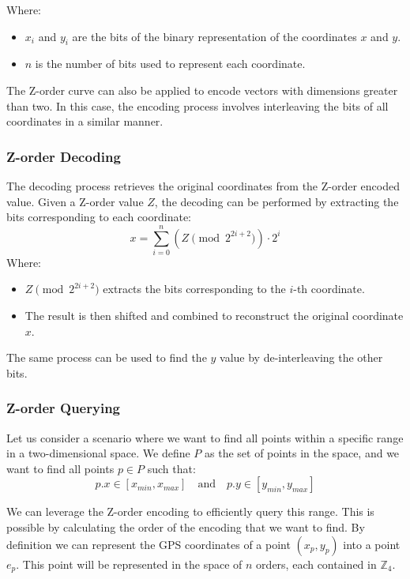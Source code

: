 Where:
\begin{itemize}
    \item \( x_i \) and \( y_i \) are the bits of the binary representation of the coordinates \( x \) and \( y \).
    \item \( n \) is the number of bits used to represent each coordinate.
\end{itemize}

The Z-order curve can also be applied to encode vectors with dimensions greater than two. In this case, the encoding process involves interleaving the bits of all coordinates in a similar manner.


\subsubsection{Z-order Decoding}
The decoding process retrieves the original coordinates from the Z-order encoded value. Given a Z-order value \( Z \), the decoding can be performed by extracting the bits corresponding to each coordinate:
\[
    x = \sum_{i=0}^{n} (Z \pmod{ 2^{2i+2} }) \cdot 2^i
\]
Where:
\begin{itemize}
    \item \( Z \pmod{ 2^{2i+2} } \) extracts the bits corresponding to the \( i \)-th coordinate.
    \item The result is then shifted and combined to reconstruct the original coordinate \( x \).
\end{itemize}

The same process can be used to find the $y$ value by de-interleaving the other bits.

\subsubsection{Z-order Querying}
Let us consider a scenario where we want to find all points within a specific range in a two-dimensional space. We define \( P \) as the set of points in the space, and we want to find all points \( p \in P \) such that:
\[
    p.x \in [x_{min}, x_{max}] \quad \text{and} \quad p.y \in [y_{min}, y_{max}]
\]

We can leverage the Z-order encoding to efficiently query this range. This is possible by calculating the order of the encoding that we want to find. 
By definition we can represent the GPS coordinates of a point \( (x_p, y_p) \) into a point \( e_p \). This point will be represented in the space of \( n \) orders, each contained in \( \mathbb{Z}_4 \).

